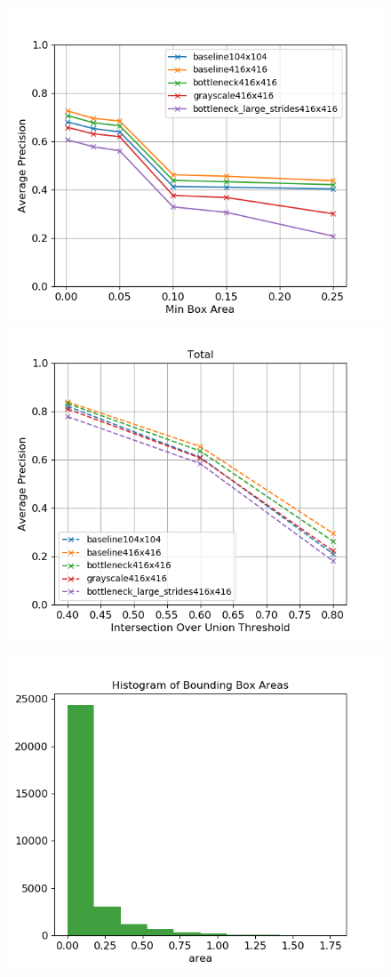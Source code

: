 \documentclass{article}
\begin{document}
\begin{figure}
	\begin{minipage}{0.45\textwidth}
		\includegraphics[width=\linewidth]{area}
	\end{minipage}
	\begin{minipage}{0.45\textwidth}
		\includegraphics[width=\linewidth]{iou}
	\end{minipage}

\end{figure}

\begin{figure}
		\includegraphics[width=0.5\linewidth]{hist_training}

\end{figure}
\end{document}
